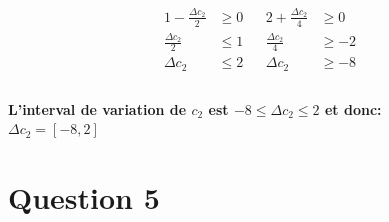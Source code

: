 \documentclass{article}
\begin{document}
\begin{spacing}{2}
\begin{center}
\begin{align*}
\begin{matrix}
      \begin{aligned}
      1-\frac{\Delta c_2}{2} & \geq 0   \\
      \frac{\Delta c_2}{2} & \leq 1   \\
      \Delta c_2 & \leq 2   \\
      \end{aligned}
                                              &                                           
      \begin{aligned}
      2+\frac{\Delta c_2}{4} & \geq 0   \\
      \frac{\Delta c_2}{4} & \geq -2   \\
      \Delta c_2 & \geq -8   \\
      \end{aligned}
      \end{matrix}
   \end{align*}
\end{center}
\end{spacing}
\begin{center}
\textbf{L'interval de variation de $c_2$ est $-8\leq\Delta c_2\leq2$ et donc:}\\
\textbf{$\Delta c_2=[-8,2]$}  

\end{center}



\pagebreak
\section*{Question 5}
\end{document}
